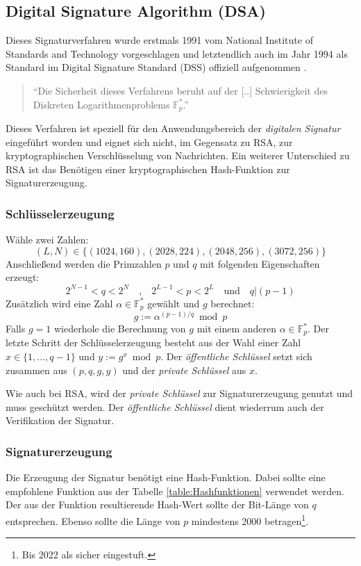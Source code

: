 \documentclass[11pt,a4paper,ngerman]{report}
\begin{document}
\subsection{Digital Signature Algorithm (DSA)}
Dieses Signaturverfahren wurde erstmals 1991 vom National Institute of Standards and Technology vorgeschlagen und letztendlich auch im Jahr 1994 als Standard im Digital Signature Standard (DSS) offiziell aufgenommen \cite[S. 125]{krypt08}.
\begin{quote}
    ``Die Sicherheit dieses Verfahrens beruht auf der [..] Schwierigkeit des Diskreten Logarithmenproblems $\mathbb{F}^*_p$.'' \cite[S. 45]{bsi-tr-02102-1}
\end{quote}
Dieses Verfahren ist speziell für den Anwendungsbereich der \textit{digitalen Signatur} eingeführt worden und eignet sich nicht, im Gegensatz zu RSA, zur kryptographischen Verschlüsselung von Nachrichten. Ein weiterer Unterschied zu RSA ist das Benötigen einer kryptographischen Hash-Funktion zur Signaturerzeugung.
\subsubsection{Schlüsselerzeugung}
Wähle zwei Zahlen:
\[
    (L, N) \in \{(1024, 160), (2028, 224), (2048, 256), (3072, 256)\}
\]
Anschließend werden die Primzahlen $p$ und $q$ mit folgenden Eigenschaften erzeugt:
\[
    2^{N-1} < q < 2^N \quad\textrm{,}\quad 2^{L-1} < p < 2^L \quad\textrm{und}\quad q|(p-1)
\]
Zusätzlich wird eine Zahl $\alpha \in \mathbb{F}^*_p$ gewählt und $g$ berechnet:
\[
    g := \alpha^{(p-1)/q} \bmod p
\]
Falls $g = 1$ wiederhole die Berechnung von $g$ mit einem anderen $\alpha \in \mathbb{F}^*_p$. Der letzte Schritt der Schlüsselerzeugung besteht aus der Wahl einer Zahl $x \in \{1, \ldots, q - 1 \}$ und $y := g^x \bmod p$. Der \textit{öffentliche Schlüssel} setzt sich zusammen aus $(p, q, g, y)$ und der \textit{private Schlüssel} aus $x$.

Wie auch bei RSA, wird der \textit{private Schlüssel} zur Signaturerzeugung genutzt und muss geschützt werden. Der \textit{öffentliche Schlüssel} dient wiederrum auch der Verifikation der Signatur.
\subsubsection{Signaturerzeugung}
Die Erzeugung der Signatur benötigt eine Hash-Funktion. Dabei sollte eine empfohlene Funktion aus der Tabelle \ref{table:Hashfunktionen} verwendet werden. Der aus der Funktion resultierende Hash-Wert sollte der Bit-Länge von $q$ entsprechen. Ebenso sollte die Länge von $p$ mindestens 2000 betragen\footnote{Bis 2022 als sicher eingestuft.}.
\end{document}
